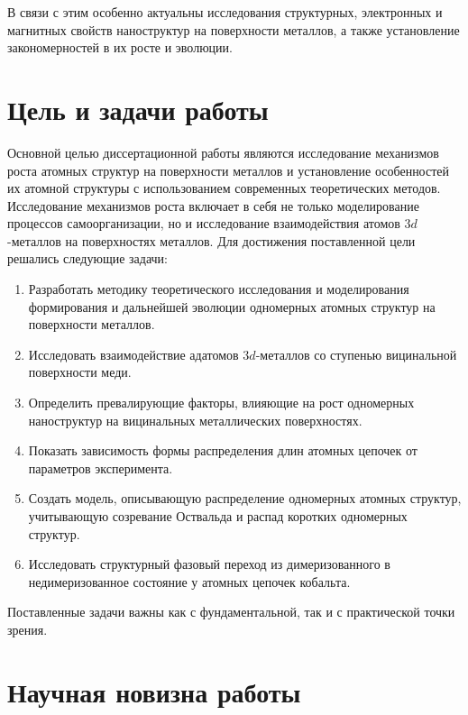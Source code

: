 \documentclass[10pt]{book}
\begin{document}
В связи с этим особенно актуальны исследования структурных, электронных и магнитных свойств наноструктур на поверхности металлов, а также установление закономерностей в их росте и эволюции.





\section{Цель и задачи работы}
Основной целью диссертационной работы являются исследование механизмов роста атомных структур на поверхности металлов и установление особенностей их атомной структуры с использованием современных теоретических методов. Исследование механизмов роста включает в себя не только моделирование процессов самоорганизации, но и исследование взаимодействия атомов $3d$-металлов на поверхностях металлов. Для достижения поставленной цели решались следующие задачи:
\begin{enumerate}
	\item Разработать методику теоретического исследования и моделирования  формирования и дальнейшей эволюции одномерных атомных структур на поверхности металлов.
	\item Исследовать взаимодействие адатомов $3d$-металлов со ступенью вицинальной поверхности меди.
	\item Определить превалирующие факторы, влияющие на рост одномерных наноструктур на вицинальных металлических поверхностях.
	\item Показать зависимость формы распределения длин атомных цепочек от параметров эксперимента.
	\item Создать модель, описывающую распределение одномерных атомных структур, учитывающую созревание Оствальда и распад коротких одномерных структур.
	\item Исследовать структурный фазовый переход из димеризованного в недимеризованное состояние у атомных цепочек кобальта.
\end{enumerate}

Поставленные задачи важны как с фундаментальной, так и с практической точки зрения.

\section{Научная новизна работы}
\end{document}
